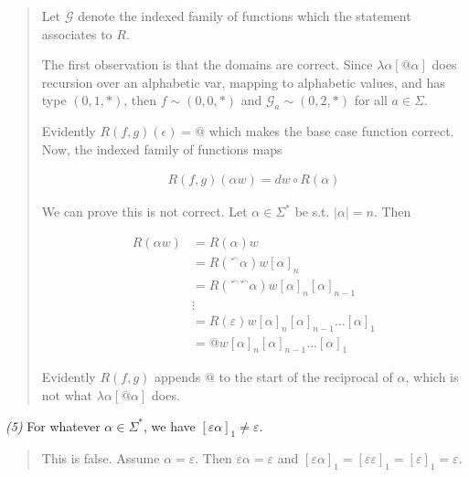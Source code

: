 \documentclass[a4paper, 12pt]{article}
\begin{document}
\small
\begin{quote}

Let $\mathcal{G}$ denote the indexed family of functions which the statement
associates to $R$. 

The first observation is that the domains are correct. Since $\lambda \alpha
\left[ @\alpha  \right]$ does recursion over an alphabetic var, mapping to
alphabetic values, and has type $(0, 1, *)$, then $f \sim (0, 0, *)$ and
$\mathcal{G}_a \sim (0, 2, *)$ for all $a \in \Sigma$.

Evidently $R(f, g)(\epsilon) = @$ which makes the base case function correct. Now, the
indexed family of functions maps

\begin{align*}
    R(f, g)(\alpha w) = dw \circ R(\alpha)
\end{align*}

We can prove this is not correct. Let $\alpha \in \Sigma^{*}$ be s.t. $|\alpha| =
n$. Then 

\begin{align*}
    R(\alpha w) &= R(\alpha)w \\ 
                &= R({}^{\curvearrowleft} \alpha) w[\alpha]_n \\ 
                &= R\left( {}^{\curvearrowleft} {}^{\curvearrowleft} \alpha
                \right) w[\alpha]_n[\alpha]_{n-1} \\ 
                &\vdots \\ 
                &=  R(\varepsilon ) w [\alpha]_n [\alpha]_{n-1} \ldots [\alpha]_1
                \\ 
                &= @w [\alpha]_n [\alpha]_{n-1} \ldots [\alpha]_1
\end{align*}

Evidently $R(f, g)$ appends $@$ to the start of the reciprocal of $\alpha$,
which is not what $\lambda \alpha \left[ @\alpha  \right]$ does.



\end{quote}
\normalsize


\textit{(5)} For whatever $\alpha \in \Sigma^{*}$, we have $[\varepsilon
\alpha]_1 \neq \varepsilon $. 





\small
\begin{quote}

This is false. Assume $\alpha = \varepsilon $. Then $\varepsilon  \alpha =
\varepsilon $ and $[\varepsilon \alpha]_1 = [\varepsilon \varepsilon ]_1 =
[\varepsilon ]_1 = \varepsilon $.

\end{quote}
\normalsize
\end{document}
